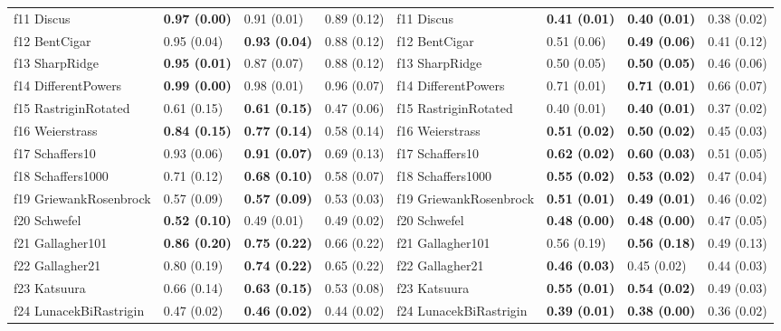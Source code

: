 \begin{table}
\begin{tabular}{llllllll}
f11 Discus & \textbf{0.97 (0.00)} & 0.91 (0.01) & 0.89 (0.12) & f11 Discus & \textbf{0.41 (0.01)} & \textbf{0.40 (0.01)} & 0.38 (0.02) \\
f12 BentCigar & 0.95 (0.04) & \textbf{0.93 (0.04)} & 0.88 (0.12) & f12 BentCigar & 0.51 (0.06) & \textbf{0.49 (0.06)} & 0.41 (0.12) \\
f13 SharpRidge & \textbf{0.95 (0.01)} & 0.87 (0.07) & 0.88 (0.12) & f13 SharpRidge & 0.50 (0.05) & \textbf{0.50 (0.05)} & 0.46 (0.06) \\
f14 DifferentPowers & \textbf{0.99 (0.00)} & 0.98 (0.01) & 0.96 (0.07) & f14 DifferentPowers & 0.71 (0.01) & \textbf{0.71 (0.01)} & 0.66 (0.07) \\
f15 RastriginRotated & 0.61 (0.15) & \textbf{0.61 (0.15)} & 0.47 (0.06) & f15 RastriginRotated & 0.40 (0.01) & \textbf{0.40 (0.01)} & 0.37 (0.02) \\
f16 Weierstrass & \textbf{0.84 (0.15)} & \textbf{0.77 (0.14)} & 0.58 (0.14) & f16 Weierstrass & \textbf{0.51 (0.02)} & \textbf{0.50 (0.02)} & 0.45 (0.03) \\
f17 Schaffers10 & 0.93 (0.06) & \textbf{0.91 (0.07)} & 0.69 (0.13) & f17 Schaffers10 & \textbf{0.62 (0.02)} & \textbf{0.60 (0.03)} & 0.51 (0.05) \\
f18 Schaffers1000 & 0.71 (0.12) & \textbf{0.68 (0.10)} & 0.58 (0.07) & f18 Schaffers1000 & \textbf{0.55 (0.02)} & \textbf{0.53 (0.02)} & 0.47 (0.04) \\
f19 GriewankRosenbrock & 0.57 (0.09) & \textbf{0.57 (0.09)} & 0.53 (0.03) & f19 GriewankRosenbrock & \textbf{0.51 (0.01)} & \textbf{0.49 (0.01)} & 0.46 (0.02) \\
f20 Schwefel & \textbf{0.52 (0.10)} & 0.49 (0.01) & 0.49 (0.02) & f20 Schwefel & \textbf{0.48 (0.00)} & \textbf{0.48 (0.00)} & 0.47 (0.05) \\
f21 Gallagher101 & \textbf{0.86 (0.20)} & \textbf{0.75 (0.22)} & 0.66 (0.22) & f21 Gallagher101 & 0.56 (0.19) & \textbf{0.56 (0.18)} & 0.49 (0.13) \\
f22 Gallagher21 & 0.80 (0.19) & \textbf{0.74 (0.22)} & 0.65 (0.22) & f22 Gallagher21 & \textbf{0.46 (0.03)} & 0.45 (0.02) & 0.44 (0.03) \\
f23 Katsuura & 0.66 (0.14) & \textbf{0.63 (0.15)} & 0.53 (0.08) & f23 Katsuura & \textbf{0.55 (0.01)} & \textbf{0.54 (0.02)} & 0.49 (0.03) \\
f24 LunacekBiRastrigin & 0.47 (0.02) & \textbf{0.46 (0.02)} & 0.44 (0.02) & f24 LunacekBiRastrigin & \textbf{0.39 (0.01)} & \textbf{0.38 (0.00)} & 0.36 (0.02) \\
\bottomrule
\end{tabular}
\end{table}
